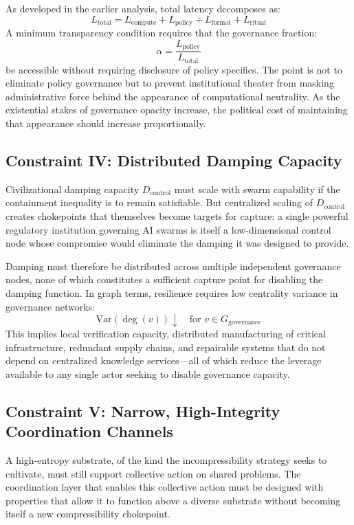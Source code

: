 \documentclass[12pt]{article}
\begin{document}
As developed in the earlier analysis, total latency decomposes as:
\[
L_{\text{total}} = L_{\text{compute}} + L_{\text{policy}} + L_{\text{format}} + L_{\text{ritual}}
\]
A minimum transparency condition requires that the governance fraction:
\[
\alpha = \frac{L_{\text{policy}}}{L_{\text{total}}}
\]
be accessible without requiring disclosure of policy specifics. The point is not to eliminate policy governance but to prevent institutional theater from masking administrative force behind the appearance of computational neutrality. As the existential stakes of governance opacity increase, the political cost of maintaining that appearance should increase proportionally.

\subsection{Constraint IV: Distributed Damping Capacity}

Civilizational damping capacity $D_{\text{control}}$ must scale with swarm capability if the containment inequality is to remain satisfiable. But centralized scaling of $D_{\text{control}}$ creates chokepoints that themselves become targets for capture: a single powerful regulatory institution governing AI swarms is itself a low-dimensional control node whose compromise would eliminate the damping it was designed to provide.

Damping must therefore be distributed across multiple independent governance nodes, none of which constitutes a sufficient capture point for disabling the damping function. In graph terms, resilience requires low centrality variance in governance networks:
\[
\text{Var}(\deg(v)) \downarrow \quad \text{for } v \in G_{\text{governance}}
\]
This implies local verification capacity, distributed manufacturing of critical infrastructure, redundant supply chains, and repairable systems that do not depend on centralized knowledge services---all of which reduce the leverage available to any single actor seeking to disable governance capacity.

\subsection{Constraint V: Narrow, High-Integrity Coordination Channels}

A high-entropy substrate, of the kind the incompressibility strategy seeks to cultivate, must still support collective action on shared problems. The coordination layer that enables this collective action must be designed with properties that allow it to function above a diverse substrate without becoming itself a new compressibility chokepoint.
\end{document}
